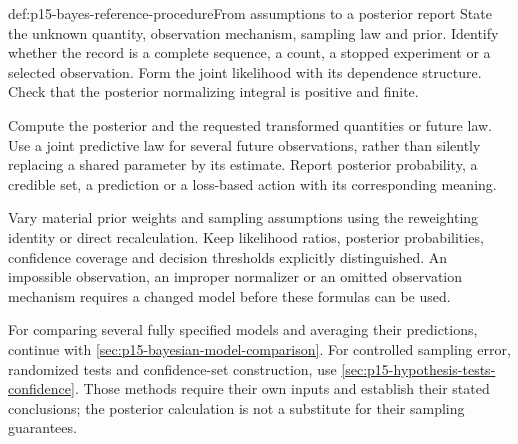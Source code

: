 \begin{hbmethod}{def:p15-bayes-reference-procedure}{From assumptions to a posterior report}
State the unknown quantity, observation mechanism, sampling law and
prior. Identify whether the record is a complete sequence, a count,
a stopped experiment or a selected observation. Form the joint
likelihood with its dependence structure. Check that the posterior
normalizing integral is positive and finite.

Compute the posterior and the requested transformed quantities or
future law. Use a joint predictive law for several future observations,
rather than silently replacing a shared parameter by its estimate.
Report posterior probability, a credible set, a prediction or a
loss-based action with its corresponding meaning.

Vary material prior weights and sampling assumptions using the
reweighting identity or direct recalculation. Keep likelihood ratios,
posterior probabilities, confidence coverage and decision thresholds
explicitly distinguished. An impossible observation, an improper
normalizer or an omitted observation mechanism requires a changed
model before these formulas can be used.
\end{hbmethod}

For comparing several fully specified models and averaging their
predictions, continue with \cref{sec:p15-bayesian-model-comparison}.
For controlled sampling error, randomized tests and confidence-set
construction, use \cref{sec:p15-hypothesis-tests-confidence}.
Those methods require their own inputs and establish their stated
conclusions; the posterior calculation is not a substitute for their
sampling guarantees.
